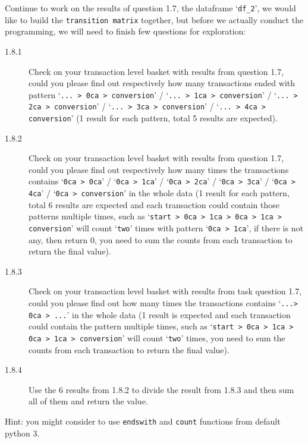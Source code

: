 \documentclass[a4paper]{article}
\begin{document}
    \begin{answer}[Question 1.8]
     Continue to work on the results of question 1.7, the dataframe `\texttt{df_2}', we would like to build the \texttt{transition matrix} together, but before we actually conduct the programming, we will need to finish few questions for exploration:

     \begin{description}
         \item[1.8.1] Check on your transaction level basket with results from question 1.7, could you please find out respectively how many transactions ended with pattern `\texttt{... > 0ca > conversion}' / `\texttt{... > 1ca > conversion}' / `\texttt{... > 2ca > conversion}' / `\texttt{... > 3ca > conversion}' / `\texttt{... > 4ca > conversion}' (1 result for each pattern, total 5 results are expected).

         \item[1.8.2] Check on your transaction level basket with results from question 1.7, could you please find out respectively how many times the transactions contains `\texttt{0ca > 0ca}' / `\texttt{0ca > 1ca}' / `\texttt{0ca > 2ca}' / `\texttt{0ca > 3ca}' / `\texttt{0ca > 4ca}' / `\texttt{0ca > conversion}' in the whole data (1 result for each pattern, total 6 results are expected and each transaction could contain those patterns multiple times, such as `\texttt{start > 0ca > 1ca > 0ca > 1ca > conversion}' will count `\texttt{two}' times with pattern `\texttt{0ca > 1ca}', if there is not any, then return 0, you need to sum the counts from each transaction to return the final value).

         \item[1.8.3] Check on your transaction level basket with results from task question 1.7, could you please find out how many times the transactions contains `\texttt{...> 0ca > ...}' in the whole data (1 result is expected and each transaction could contain the pattern multiple times, such as `\texttt{start > 0ca > 1ca > 0ca > 1ca > conversion}' will count `\texttt{two}' times, you need to sum the counts from each transaction to return the final value).

         \item[1.8.4] Use the 6 results from 1.8.2 to divide the result from 1.8.3 and then sum all of them and return the value.
     \end{description}

     Hint: you might consider to use \texttt{endswith} and \texttt{count} functions from default python 3.

    \end{answer}
\end{document}
